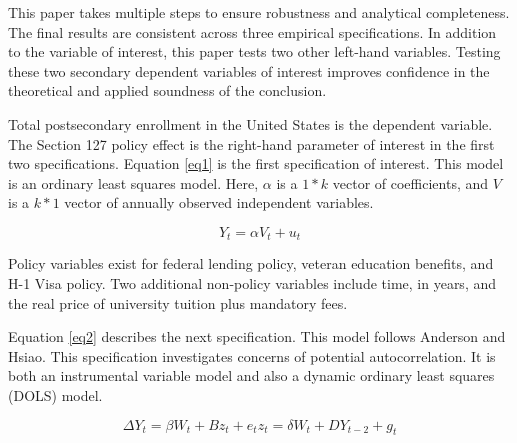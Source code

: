 \documentclass[review]{elsarticle}
\begin{document}
This paper takes multiple steps to ensure robustness and analytical completeness.
The final results are consistent across three empirical specifications.
In addition to the variable of interest, this paper tests two other left-hand variables.
Testing these two secondary dependent variables of interest improves confidence in the theoretical and applied soundness of the conclusion.

Total postsecondary enrollment in the United States is the dependent variable.
The Section 127 policy effect is the right-hand parameter of interest in the first two specifications.
Equation \ref{eq1} is the first specification of interest. This model is an ordinary least squares model.
Here, $\alpha$ is a $1*k$ vector of coefficients,
and $V$ is a $k*1$ vector of annually observed independent variables.

\begin{equation}
    Y_t = \alpha{V_{t}}+u_t
    \label{eq1}
\end{equation}

Policy variables exist for federal lending policy, veteran education benefits, and H-1 Visa policy.
Two additional non-policy variables include time, in years,
and the real price of university tuition plus mandatory fees.

Equation \ref{eq2} describes the next specification.
This model follows Anderson and Hsiao\cite{anderson1981estimation}.
This specification investigates concerns of potential autocorrelation.
It is both an instrumental variable model and also a dynamic ordinary least squares (DOLS) model.

\begin{subequations}
    \begin{equation}
        \Delta{Y_t} = \beta{W_{t}}+B{z_t}+e_t
        \label{eq2}
    \end{equation}
    \begin{equation}
        z_t = \delta{W_{t}}+D{Y_{t-2}}+g_t
        \label{eq3}
    \end{equation}
\end{subequations}
\end{document}
